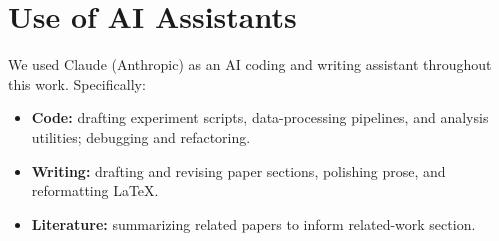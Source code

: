 \section{Use of AI Assistants}
\label{app:ai-assistants}

We used Claude (Anthropic) as an AI coding and writing assistant
throughout this work. Specifically:
\begin{itemize}
    \item \textbf{Code:} drafting experiment scripts, data-processing
    pipelines, and analysis utilities; debugging and refactoring.
    \item \textbf{Writing:} drafting and revising paper sections,
    polishing prose, and reformatting LaTeX.
    \item \textbf{Literature:} summarizing related papers to inform
    related-work section.
\end{itemize}
